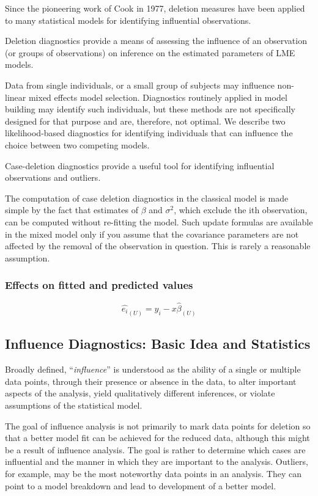 \documentclass[Main.tex]{subfiles}
\begin{document}
	Since the pioneering work of Cook in 1977, deletion measures have been applied to many statistical models for identifying influential observations.
	
	Deletion diagnostics provide a means of assessing the influence of an observation (or groups of observations) on inference on the estimated parameters of LME models.
	
	Data from single individuals, or a small group of subjects may influence non-linear mixed effects model selection. Diagnostics routinely applied in model building may identify such individuals, but these methods are not specifically designed for that purpose and are, therefore, not optimal. We describe two likelihood-based diagnostics for identifying individuals that can influence the choice between two competing models.
	
	Case-deletion diagnostics provide a useful tool for identifying influential observations and outliers.
	
	The computation of case deletion diagnostics in the classical model is made simple by the fact that estimates of $\beta$ and $\sigma^2$, which exclude the ith observation, can be computed without re-fitting the model. Such update formulas are available in the mixed model only if you assume that the covariance parameters are not affected by the removal of the observation in question. This is rarely a reasonable assumption.
	
	\subsubsection{Effects on fitted and predicted values}
	\begin{equation}
	\hat{e_{i}}_{(U)} = y_{i} - x\hat{\beta}_{(U)}
	\end{equation}
	\newpage
	
\subsection{Influence Diagnostics: Basic Idea and Statistics} %
Broadly defined, ``\textit{influence}” is understood as the ability of a single or multiple data points, through their presence or absence in the data, to alter important aspects of the analysis, yield qualitatively different inferences, or
		violate assumptions of the statistical model. 
		
		
		The goal of influence analysis is not primarily to mark data
		points for deletion so that a better model fit can be achieved for the reduced data, although this might be a
		result of influence analysis. The goal is rather to determine which cases are influential and the manner in
		which they are important to the analysis. Outliers, for example, may be the most noteworthy data points in
		an analysis. They can point to a model breakdown and lead to development of a better model.
		
\end{document}
